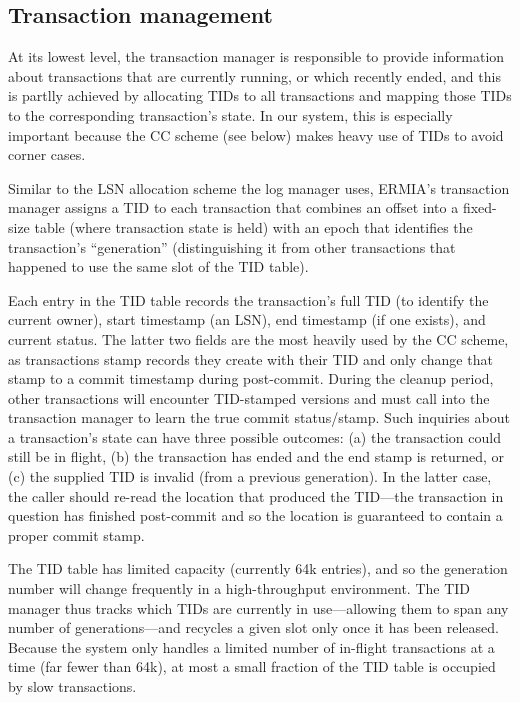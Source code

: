 \subsection{Transaction management}
At its lowest level, the transaction manager is responsible to provide information about transactions that are currently running, or which recently ended, and this is partlly achieved by allocating TIDs to all transactions and mapping those TIDs to the corresponding transaction's state. In our system, this is especially important because the CC scheme (see below) makes heavy use of TIDs to avoid corner cases.

Similar to the LSN allocation scheme the log manager uses, ERMIA's transaction manager assigns a TID to each transaction that combines an offset into a fixed-size table (where transaction state is held) with an epoch that identifies the transaction's ``generation'' (distinguishing it from other transactions that happened to use the same slot of the TID table).

Each entry in the TID table records the transaction's full TID (to identify the current owner), start timestamp (an LSN), end timestamp (if one exists), and current status. The latter two fields are the most heavily used by the CC scheme, as transactions stamp records they create with their TID and only change that stamp to a commit timestamp during post-commit. During the cleanup period, other transactions will encounter TID-stamped versions and must call into the transaction manager to learn the true commit status/stamp. Such inquiries about a transaction's state can have three possible outcomes: (a) the transaction could still be in flight, (b) the transaction has ended and the end stamp is returned, or (c) the supplied TID is invalid (from a previous generation). In the latter case, the caller should re-read the location that produced the TID---the transaction in question has finished post-commit and so the location is guaranteed to contain a proper commit stamp.

The TID table has limited capacity (currently 64k entries), and so the generation number will change frequently in a high-throughput environment. The TID manager thus tracks which TIDs are currently in use---allowing them to span any number of generations---and recycles a given slot only once it has been released. Because the system only handles a limited number of in-flight transactions at a time (far fewer than 64k), at most a small fraction of the TID table is occupied by slow transactions. 

